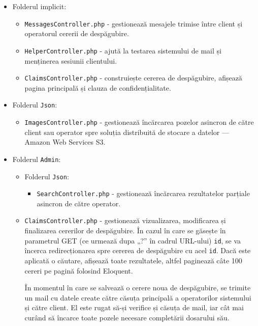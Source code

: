 	\begin{itemize}
		\item Folderul implicit:
			\begin{itemize}
				\item \verb|MessagesController.php| - gestionează mesajele trimise între client și operatorul cererii de despăgubire.
				\item \verb|HelperController.php| - ajută la testarea sistemului de mail și menținerea sesiunii clientului.
				\item \verb|ClaimsController.php| - construiește cererea de despăgubire, afișează pagina principală și clauza de confidențialitate.
			\end{itemize}
		\item Folderul \verb|Json|:
			\begin{itemize}
				\item \verb|ImagesController.php| - gestionează încărcarea pozelor asincron de către client sau operator spre soluția distribuită de stocare a datelor --- Amazon Web Services S3.
			\end{itemize}
		\item Folderul \verb|Admin|:
			\begin{itemize}
				\item Folderul \verb|Json|:
				\begin{itemize}
					\item \verb|SearchController.php| - gestionează încărcarea rezultatelor parțiale asincron de către operator.
				\end{itemize}
				\item
					\verb|ClaimsController.php| - gestionează vizualizarea, modificarea și finalizarea cererilor de despăgubire.
					În cazul în care se găsește în parametrul GET (ce urmează dupa „?” în cadrul URL-ului) \verb|id|, se va încerca redirecționarea spre cererea de despăgubire cu acel \verb|id|.
					Dacă este aplicată o căutare, afișează toate rezultatele, altfel paginează câte 100 cereri pe pagină folosind Eloquent.

					În momentul în care se salvează o cerere noua de despăgubire, se trimite un mail cu datele create către căsuța principală a operatorilor sistemului și către client.
					El este rugat să-și verifice și căsuța de mail, iar cât mai curând să încarce toate pozele necesare completării dosarului său.


\end{itemize}
\end{itemize}
